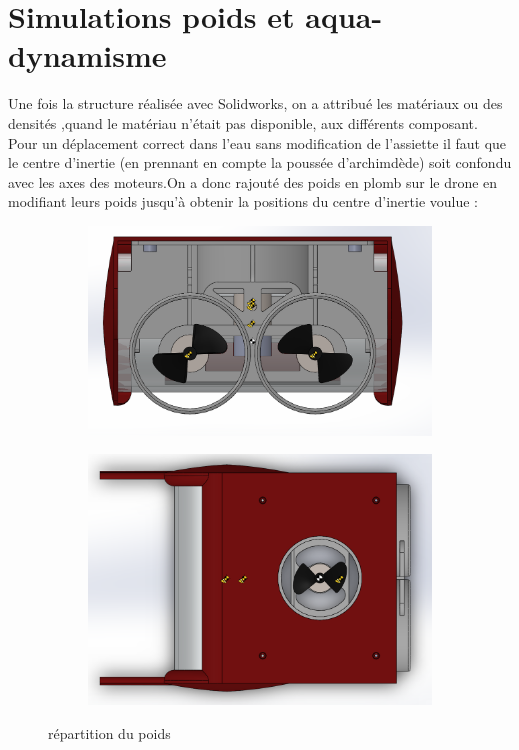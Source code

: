 \documentclass[a4paper,11pt]{report}
\begin{document}
			\section{Simulations poids et aqua-dynamisme}
					Une fois la structure réalisée avec Solidworks, on a attribué les matériaux ou des densités ,quand le matériau n'était pas disponible, aux différents composant.\newline
				Pour un déplacement correct dans l'eau sans modification de l'assiette il faut que le centre d'inertie (en prennant en compte la poussée d'archimdède) soit confondu avec les axes des moteurs.On a donc rajouté des poids en plomb sur le drone en modifiant leurs poids jusqu'à obtenir la positions du centre d'inertie voulue : 
					\begin{figure}[!h]
						\centering
							\begin{subfigure}[b]{0.3\textwidth}
								\includegraphics[width=\textwidth]{Photos/Capture20.png}
							\end{subfigure}
							\begin{subfigure}[b]{0.3\textwidth}
								\includegraphics[width=\textwidth]{Photos/Capture21.png}
							\end{subfigure}
							\caption{répartition du poids}
					\end{figure}\newline
					
\end{document}
